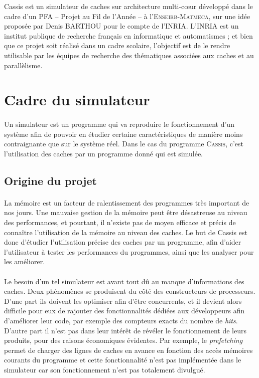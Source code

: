\textsf{Cassis} est un simulateur de caches sur architecture multi-c\oe ur développé dans le cadre d'un PFA -- Projet au Fil de l'Année -- à l'\textsc{Enseirb-Matmeca}, sur une idée proposée par Denis BARTHOU pour le compte de l'\textsf{INRIA}. L'\textsf{INRIA} est un institut publique de recherche français en informatique et automatismes ; et bien que ce projet soit réalisé dans un cadre scolaire, l'objectif est de le rendre utilisable par les équipes de recherche des thématiques associées aux caches et au parallèlisme.

\section{Cadre du simulateur}

\paragraph{}
Un simulateur est un programme qui va reproduire le fonctionnement d'un système afin de pouvoir en étudier certaine caractéristiques de manière moins contraignante que sur le système réel. Dans le cas du programme \textsc{Cassis}, c'est l'utilisation des caches par un programme donné qui est simulée.

\subsection{Origine du projet}

\paragraph{}
La mémoire est un facteur de ralentissement des programmes très important de nos jours. Une mauvaise gestion de la mémoire peut être désastreuse au niveau des performances, et pourtant, il n'existe pas de moyen efficace et précis de connaître l'utilisation de la mémoire au niveau des caches. Le but de \textsf{Cassis} est donc d'étudier l'utilisation précise des caches par un programme, afin d'aider l'utilisateur à tester les performances du programmes, ainsi que les analyser pour les améliorer.

\paragraph{}
Le besoin d'un tel simulateur est avant tout dû au manque d'informations des caches. Deux phénomènes se produisent du côté des constructeurs de processeurs. D'une part ils doivent les optimiser afin d'être concurrents, et il devient alors difficile pour eux de rajouter des fonctionnalités dédiées aux développeurs afin d'améliorer leur code, par exemple des compteurs exacts du nombre de \emph{hits}. D'autre part il n'est pas dans leur intérêt de révéler le fonctionnement de leurs produits, pour des raisons économiques évidentes. Par exemple, le \emph{prefetching} permet de charger des lignes de caches en avance en fonction des accès mémoires courants du programme et cette fonctionnalité n'est pas implémentée dans le simulateur car son fonctionnement n'est pas totalement divulgué.

